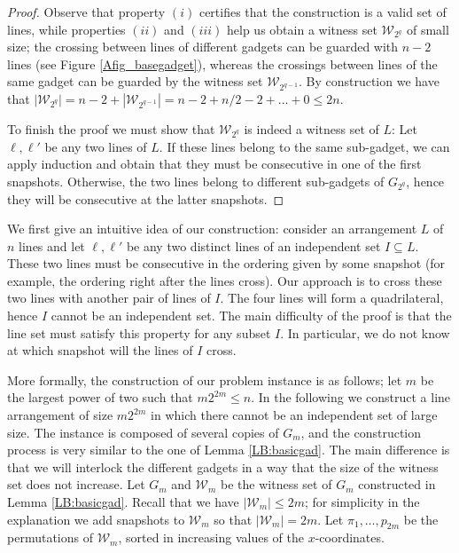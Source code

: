 \documentclass[11pt,a4paper]{article}
\begin{document}
\begin{proof}
Observe that property $(i)$ certifies that the construction is a valid set of lines, while properties $(ii)$ and $(iii)$ help us obtain a witness set $\mathcal{W}_{2^q}$ of small size; the crossing between lines of different gadgets  can be guarded with $n-2$ lines (see Figure \ref{Afig_basegadget}), whereas the crossings between lines of the same gadget can be guarded by the witness set $\mathcal{W}_{2^{q-1}}$. By construction we have that $|\mathcal{W}_{2^q}|= n-2+ |\mathcal{W}_{2^{q-1}}| = n-2 + n/2-2+\ldots +0 \leq 2n$.

To finish the proof we must show that $\mathcal{W}_{2^q}$ is indeed a witness set of $L$: Let $\ell,\ell'$ be any two lines of $L$. If these lines belong to the same sub-gadget, we can apply induction and obtain that they must be consecutive in one of the first snapshots. Otherwise, the two lines belong to different sub-gadgets of $G_{2^q}$, hence they will be consecutive at the latter snapshots.
\end{proof}
\fi

We first give an intuitive idea of our construction: consider an arrangement $L$ of $n$ lines and let $\ell,\ell'$ be any two distinct lines of an independent set $I\subseteq L$. These two lines must be consecutive in the ordering given by some snapshot (for example, the ordering right after the lines cross). Our approach is to cross these two lines with another pair of lines of $I$. The four lines will form a quadrilateral, hence $I$ cannot be an independent set. The main difficulty of the proof is that the line set must satisfy this property for any subset $I$. In particular, we do not know at which snapshot will the lines of $I$ cross.

More formally, the construction of our problem instance is as follows; let $m$ be the largest power of two such that $m2^{2m}\leq n$. In the following we construct a line arrangement of size $m2^{2m}$ in which there cannot be an independent set of large size. The instance is composed of several copies of $G_m$, and the construction process is very similar to the one of Lemma \ref{LB:basicgad}. The main difference is that we will interlock the  different gadgets in a way that the size of the witness set does not increase. Let $G_m$ and  $\mathcal{W}_m$ be the witness set of $G_m$ constructed in Lemma \ref{LB:basicgad}. Recall that we have $|\mathcal{W}_m|\leq 2m$; for simplicity in the explanation we add snapshots to $\mathcal{W}_m$ so that $|\mathcal{W}_m| = 2m$. Let $\pi_1,\ldots, p_{2m}$ be the permutations of $\mathcal{W}_m$, sorted in increasing values of the $x$-coordinates.
\end{document}
